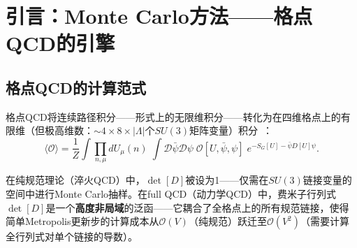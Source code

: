\documentclass[12pt,a4paper]{ctexart}
\theoremstyle{definition}
\begin{document}
\begin{abstract}
\textbf{第五层——Hybrid Monte Carlo (HMC)（§6）：}
这是格点QCD中动力学费米子的\textbf{首选算法}。详细推导HMC的五个组成步骤：(i) 赝费米子场的Gaussian生成（$\phi = D \chi$, $\chi \sim e^{-\chi^\dagger \chi}$）；(ii) 共轭动量的Gaussian生成（$e^{-P^2/2}$）；(iii) 分子动力学演化——蛙跳（leapfrog）积分器，保持相空间体积和可逆性；(iv) Metropolis接受/拒绝步骤——由$e^{-\Delta H}$控制，修正MD积分的$\mathcal{O}(\epsilon^2)$离散化误差；(v) 规范场与赝费米子的交替更新。阐明确保SU(3)群流形上演化的指数映射$\exp(i\epsilon P) U$和driving force $F[U,\phi]$的计算。

\textbf{第六层——高级算法与现代策略（§7）：}
简介R-algorithm（对交错费米子的非精确算法）、Polynomial HMC和Rational HMC（PHMC/RHMC——适用于单味夸克和Overlap费米子）、多伪费米子与UV过滤（降低力涨落以提高接受率）、多时间尺度（multiple time scale）积分器（对规范和费米子力分量使用不同MD步长）、以及HISQ和Twisted Mass费米子的专用预条件策略。
\end{abstract}

\tableofcontents
\newpage

\section{引言：Monte Carlo方法——格点QCD的引擎}

\subsection{格点QCD的计算范式}

格点QCD将连续路径积分——形式上的无限维积分——转化为在四维格点上的有限维（但极高维数：$\sim 4 \times 8 \times |\Lambda|$个$SU(3)$矩阵变量）积分~\cite{GattringerLang2010}：
\begin{equation}
\langle \mathcal{O} \rangle = \frac{1}{Z} \int \prod_{n,\mu} dU_\mu(n) \; \int \mathcal{D}\bar\psi\mathcal{D}\psi \; \mathcal{O}[U,\bar\psi,\psi] \; e^{-S_G[U] - \bar\psi D[U] \psi}.
\label{eq:path_integral}
\end{equation}

在纯规范理论（淬火QCD）中，$\det[D]$被设为1——仅需在$SU(3)$链接变量的空间中进行Monte Carlo抽样。在full QCD（动力学QCD）中，费米子行列式$\det[D]$是一个\textbf{高度非局域}的泛函——它耦合了全格点上的所有规范链接，使得简单Metropolis更新步的计算成本从$\mathcal{O}(V)$（纯规范）跃迁至$\mathcal{O}(V^2)$（需要计算全行列式对单个链接的导数）。
\end{document}
